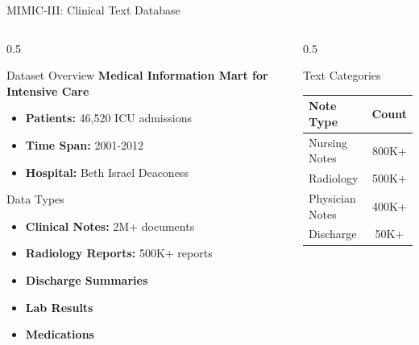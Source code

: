 \documentclass[aspectratio=169]{beamer}
\begin{document}
\begin{frame}{MIMIC-III: Clinical Text Database}
    \begin{columns}
        \begin{column}{0.5\textwidth}
            \begin{block}{Dataset Overview}
                \textbf{Medical Information Mart for Intensive Care}
                \begin{itemize}
                    \item \textbf{Patients:} 46,520 ICU admissions
                    \item \textbf{Time Span:} 2001-2012
                    \item \textbf{Hospital:} Beth Israel Deaconess
                \end{itemize}
            \end{block}
            
            \begin{block}{Data Types}
                \begin{itemize}
                    \item \textbf{Clinical Notes:} 2M+ documents
                    \item \textbf{Radiology Reports:} 500K+ reports
                    \item \textbf{Discharge Summaries}
                    \item \textbf{Lab Results}
                    \item \textbf{Medications}
                \end{itemize}
            \end{block}
        \end{column}
        \begin{column}{0.5\textwidth}
            \begin{block}{Text Categories}
                \begin{center}
                    \begin{tabular}{lc}
                        \toprule
                        \textbf{Note Type} & \textbf{Count} \\
                        \midrule
                        Nursing Notes & 800K+ \\
                        Radiology & 500K+ \\
                        Physician Notes & 400K+ \\
                        Discharge & 50K+ \\
                        \bottomrule
                    \end{tabular}
                \end{center}
            \end{block}
            

\end{column}
\end{columns}
\end{frame}
\end{document}
